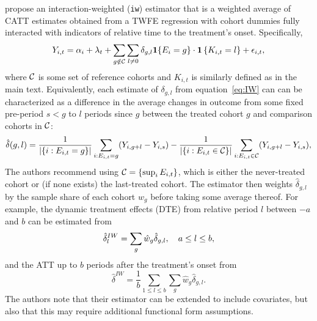 \documentclass[12pt]{article}
\begin{document}
\citet{sun2021-event} propose an interaction-weighted (\texttt{iw}) estimator that is a weighted average of CATT estimates obtained from a TWFE regression with cohort dummies fully interacted with indicators of relative time to the treatment's onset. Specifically,
\vspace{-1em}\begin{equation}\label{eq:IW}
    Y_{i,t} = \alpha_{i} + \lambda_{t} + \sum_{g\notin\mc{C}}\sum_{l\neq 0}\delta_{g,l}\mbf{1}\{E_i = g\}\cdot \indic{K_{i,t}=l} + \epsilon_{i,t},
\vspace{-0.5em}\end{equation}
where $\mathcal{C}$ is some set of reference cohorts and $K_{i,t}$ is similarly defined as in the main text. 
Equivalently, each estimate of $\delta_{g,l}$ from equation~\ref{eq:IW} can can be characterized as a difference in the average changes in outcome from some fixed pre-period $s < g$ to $l$ periods since $g$ between the treated cohort $g$ and comparison cohorts in $\mathcal{C}$:
 \begin{align*}
     \hat\delta(g,l) = 
     \frac{1}{|\{i:E_{i,t}=g\}|}\sum_{i: E_{i,t}=g}(Y_{i,g+l}-Y_{i,s})-
     \frac{1}{|\{i:E_{i,t}\in \mathcal{C}\}|}\sum_{i: E_{i,t}\in \mathcal{C}}(Y_{i,g+l}-Y_{i,s}),
 \end{align*}
The authors recommend using $\mathcal{C}=\{\sup_i E_{i,t} \}$, which is either the never-treated cohort or (if none exists) the last-treated cohort. The estimator then weights $\hat\delta_{g,l}$ by the sample share of each cohort $\hat w_{g}$ before taking some average thereof. For example, the dynamic treatment effects (DTE) from relative period $l$ between $-a$ and $b$ can be estimated from
\vspace{-0.5em}\begin{equation*}
    \hat{\delta}^{IW}_{l} = \sum_{g} \hat{w}_{g} \hat\delta_{g,l},\quad a \leq l \leq b, 
\vspace{-0.5em}\end{equation*}
and the ATT up to $b$ periods after the treatment's onset from
\vspace{-0.5em}\begin{equation*}
    \hat{\delta}^{IW} = \frac{1}{b}\sum_{1\leq l\leq b}\sum_{g} \hat{w}_{g} \hat\delta_{g,l} .
\end{equation*}
The authors note that their estimator can be extended to include covariates, but also that this may require additional functional form assumptions.
\end{document}
